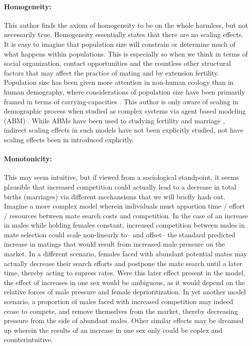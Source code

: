 \paragraph{Homogeneity:} This author finds the axiom of homogeneity to be on the
whole harmless, but not necessarily true. Homogeneity essentially states that
there are no scaling effects. It is easy to imagine that population size will
constrain or determine much of what happens within populations. This is
especially so when we think in terms of social organization, contact
opportunities and the countless other structural factors that may affect the
practice of mating and by extension fertility. Population size has been
given more attention in non-human ecology \citep{donalson1999population} than in
human demography, where considerations of population size have been primarily framed in terms of
carrying-capacities \citep[see e.g.][]{cohen1995human,hopfenberg2003human}. This
author is only aware of scaling in demographic process when studied as complex systems via
agent based modeling (ABM) \citep[e.g.][]{bruch2010scaling}. While ABMs have
been used to studying fertility and marriage \citep{billari2002wedding},
indirect scaling effects in such models have not been explicitly studied, not
have scaling effects been in introduced explicitly.

\paragraph{Monotonicity:} This may seem intuitive, but if viewed from a
sociological standpoint, it seems plausible that increased competition could actually lead to a
decrease in total births (marriages) via different mechansisms that we will
briefly hash out. Imagine a more complex model wherein individuals must
apportion time / effort / resources between mate search costs and competition. 
In the case of an increase in males while holding females
constant, increased competition between males in mate selection could
 scale non-linearly to-- and offset-- the standard predicted increase in matings
 that would result from increased male pressure on the market. In a different
 scenario, females faced with abundant potential mates may actually decrease their 
 search efforts and postpone the mate search until a later time,
 thereby acting to supress rates. Were this later effect present in the model,
 the effect of increases in one sex would be ambiguous, as it would depend on
 the relative forces of male pressure and female deprioritization. In yet
 another model scenario, a proportion of males faced with increased competition may 
 indeed cease to compete, and remove themselves from the market, thereby 
 decreasing pressure from the side of abundant males. Other similar effects may
 be dreamed up wherein the results of an increase in one sex only could be
 coplex and counterintuitive. 
 

